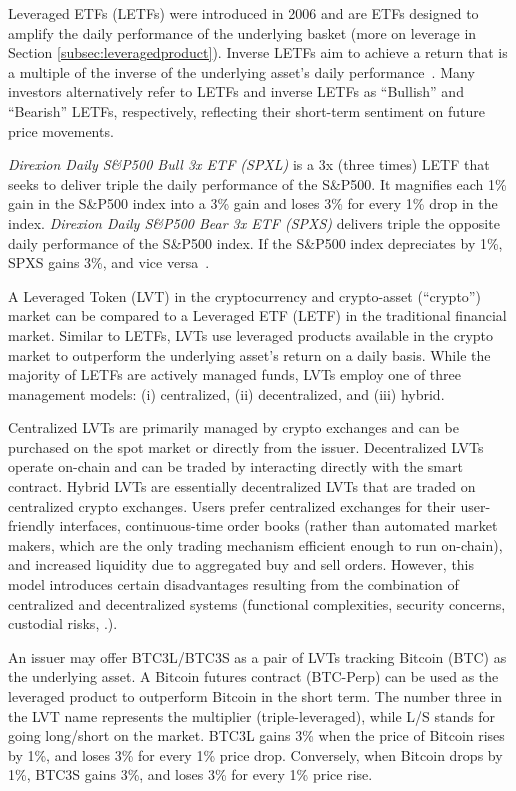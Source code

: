Leveraged ETFs (LETFs) were introduced in 2006 and are ETFs designed to amplify the daily performance of the underlying basket (more on leverage in Section \ref{subsec:leveragedproduct}). Inverse LETFs aim to achieve a return that is a multiple of the inverse of the underlying asset’s daily performance~\cite{hill2009understanding,cheng2009dynamics,SEC}. Many investors alternatively refer to LETFs and inverse LETFs as ``Bullish'' and ``Bearish'' LETFs, respectively, reflecting their short-term sentiment on future price movements.
\begin{example}
	\textsl{Direxion Daily S\&P500 Bull 3x ETF (SPXL)} is a 3x (three times) LETF that seeks to deliver triple the daily performance of the S\&P500. It magnifies each 1\% gain in the S\&P500 index into a 3\% gain and loses 3\% for every 1\% drop in the index. \textsl{Direxion Daily S\&P500 Bear 3x ETF (SPXS)} delivers triple the opposite daily performance of the S\&P500 index. If the S\&P500 index depreciates by 1\%, SPXS gains 3\%, and vice versa~\cite{wided2019properties,lettau2018exchange}.
\end{example}

A Leveraged Token (LVT) in the cryptocurrency and crypto-asset (``crypto'') market can be compared to a Leveraged ETF (LETF) in the traditional financial market. Similar to LETFs, LVTs use leveraged products available in the crypto market to outperform the underlying asset’s return on a daily basis. While the majority of LETFs are actively managed funds, LVTs employ one of three management models: (i) centralized, (ii) decentralized, and (iii) hybrid. 

Centralized LVTs are primarily managed by crypto exchanges and can be purchased on the spot market or directly from the issuer. Decentralized LVTs operate on-chain and can be traded by interacting directly with the smart contract. Hybrid LVTs are essentially decentralized LVTs that are traded on centralized crypto exchanges. Users prefer centralized exchanges for their user-friendly interfaces, continuous-time order books (rather than automated market makers, which are the only trading mechanism efficient enough to run on-chain), and increased liquidity due to aggregated buy and sell orders. However, this model introduces certain disadvantages resulting from the combination of centralized and decentralized systems (\eg functional complexities, security concerns, custodial risks, \etc.).

\begin{example}
	An issuer may offer BTC3L/BTC3S as a pair of LVTs tracking Bitcoin (BTC) as the underlying asset. A Bitcoin futures contract (BTC-Perp) can be used as the leveraged product to outperform Bitcoin in the short term. The number three in the LVT name represents the multiplier (triple-leveraged), while L/S stands for going long/short on the market. BTC3L gains 3\% when the price of Bitcoin rises by 1\%, and loses 3\% for every 1\% price drop. Conversely, when Bitcoin drops by 1\%, BTC3S gains 3\%, and loses 3\% for every 1\% price rise.
\end{example}

